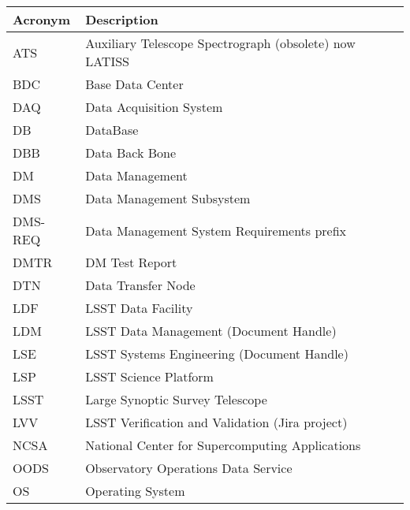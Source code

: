 \addtocounter{table}{-1}
\begin{longtable}{p{}p{}}\hline
\textbf{Acronym} & \textbf{Description}  \\\hline

ATS & Auxiliary Telescope Spectrograph (obsolete) now LATISS \\\hline
BDC &  Base Data Center \\\hline
DAQ & Data Acquisition System \\\hline
DB & DataBase \\\hline
DBB & Data Back Bone \\\hline
DM & Data Management \\\hline
DMS & Data Management Subsystem \\\hline
DMS-REQ & Data Management System Requirements prefix \\\hline
DMTR & DM Test Report \\\hline
DTN & Data Transfer Node \\\hline
LDF & LSST Data Facility \\\hline
LDM & LSST Data Management (Document Handle) \\\hline
LSE & LSST Systems Engineering (Document Handle) \\\hline
LSP & LSST Science Platform \\\hline
LSST & Large Synoptic Survey Telescope \\\hline
LVV & LSST Verification and Validation (Jira project) \\\hline
NCSA & National Center for Supercomputing Applications \\\hline
OODS & Observatory Operations Data Service \\\hline
OS & Operating System \\\hline
\end{longtable}

